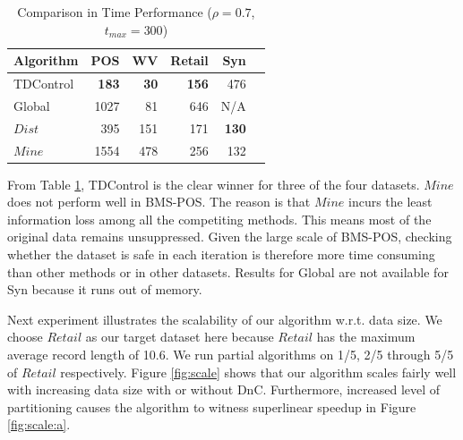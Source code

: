 \begin{table}[th]
\caption{Comparison in Time Performance ($\rho=0.7$, $t_{max}=300$)
\label{tab:timeresult}}
\centering
\begin{tabular}{|l|r|r|r|r|r|}
  \hline
  Algorithm & POS & WV & Retail  &Syn \\  \hline \hline
  TDControl & \bf{183} & \bf{30 }& \bf{156} &   476  \\  \hline
  Global & 1027 & 81 & 646 &   N/A  \\  \hline
  $Dist$ & 395 & 151 & 171 &\bf{130}\\ \hline
  $Mine$ & 1554 & 478& 256 & 132\\ \hline
  \end{tabular}
\end{table}

From Table \ref{tab:timeresult}, TDControl is the clear winner
for three of the four datasets. $Mine$ does not perform well in BMS-POS. The reason is that $Mine$ incurs the least information loss among all the
competiting methods. This means most of the original data remains
unsuppressed. Given the large scale of BMS-POS, checking whether the
dataset is safe in each iteration is therefore more time consuming than
other methods or in other datasets. Results for Global are not available for Syn because it runs out of memory.

Next experiment illustrates the scalability of our algorithm
w.r.t. data size. We choose $Retail$ as our target dataset here
because $Retail$ has the maximum average record length of 10.6.
We run partial algorithms on 1/5, 2/5 through 5/5 of $Retail$ respectively.
Figure \ref{fig:scale} shows that our algorithm scales fairly well
with increasing data size with or without DnC.
Furthermore, increased level of partitioning causes the algorithm to witness
superlinear speedup in Figure \ref{fig:scale:a}. 

